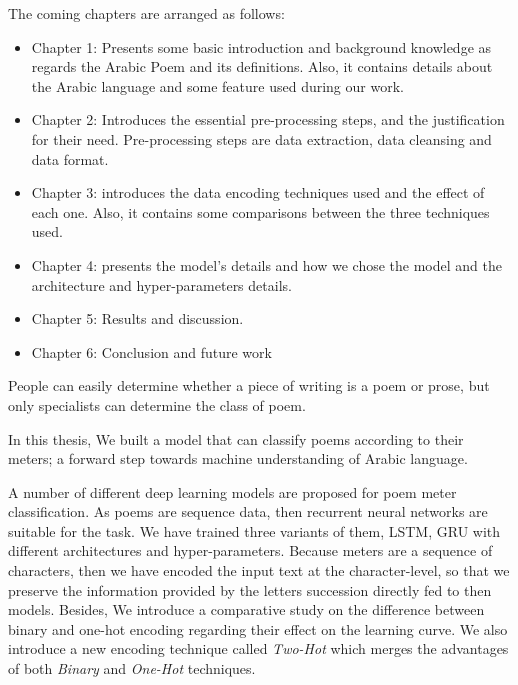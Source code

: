 \newpage


\begin{spacing}{1}\end{spacing}
The coming chapters are arranged as follows:
\begin{itemize}
  \item Chapter 1: Presents some basic introduction and background knowledge as regards the Arabic Poem and its definitions. Also, it contains details about the Arabic language and some feature used during our work.
  \item Chapter 2: Introduces the essential pre-processing steps, and the justification for their need. Pre-processing steps are data extraction, data cleansing and data format.
  \item Chapter 3: introduces the data encoding techniques used and the effect of each one. Also, it contains some comparisons between the three techniques used.
  \item Chapter 4: presents the model's details and how we chose the model and the architecture and hyper-parameters details.
  \item Chapter 5: Results and discussion.
  \item Chapter 6: Conclusion and future work
\end{itemize}


 \newpage




\begin{spacing}{1}\end{spacing}


People can easily determine whether a piece of writing is a poem or prose, but only specialists can determine the class of poem.

In this thesis, We built a model that can classify poems according to their meters; a forward step towards machine understanding of Arabic language.

A number of different deep learning models are proposed for poem meter classification. As poems are sequence data, then recurrent neural networks are suitable for the task. We have trained three variants of them, LSTM, GRU with different architectures and hyper-parameters. Because meters are a sequence of characters, then we have encoded the input text at the character-level, so that we preserve the information provided by the letters succession directly fed to then models. Besides, We introduce a comparative study on the difference between binary and one-hot encoding regarding their effect on the learning curve. We also introduce a new encoding technique called \textit{Two-Hot} which merges the advantages of both \textit{Binary} and \textit{One-Hot} techniques.


